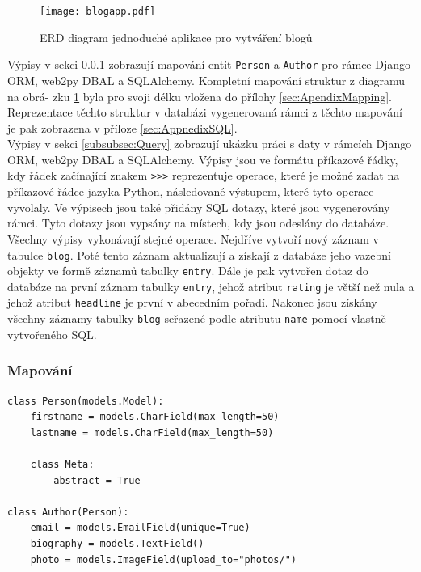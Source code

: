 \documentclass[ing,male,java,dept456]{diploma}						%
\begin{document}
\begin{figure}[h!]
    \centering
    \texttt{[image: blogapp.pdf]}
    \caption{ERD diagram jednoduché aplikace pro vytváření blogů}
    \label{fig:BlogappErd}
\end{figure}

Výpisy v sekci \ref{subsubsec:Mapping} zobrazují mapování entit \lstinline[style=inlinepython]|Person| a \lstinline[style=inlinepython]|Author| pro rámce Django ORM, web2py DBAL a SQLAlchemy. Kompletní mapování struktur z diagramu na obrá- zku \ref{fig:BlogappErd} byla pro svoji délku vložena do přílohy \ref{sec:ApendixMapping}. Reprezentace těchto struktur v databázi vygenerovaná rámci z těchto mapování je pak zobrazena v příloze \ref{sec:AppnedixSQL}. \\
Výpisy v sekci \ref{subsubsec:Query} zobrazují ukázku práci s daty v rámcích Django ORM, web2py DBAL a SQLAlchemy. Výpisy jsou ve formátu příkazové řádky, kdy řádek začínající znakem \lstinline[style=inlinepython]|>>>| reprezentuje operace, které je možné zadat na příkazové řádce jazyka Python, následované výstupem, které tyto operace vyvolaly. Ve výpisech jsou také přidány SQL dotazy, které jsou vygenerovány rámci. Tyto dotazy jsou vypsány na místech, kdy jsou odeslány do databáze. \\
Všechny výpisy vykonávají stejné operace. Nejdříve vytvoří nový záznam v tabulce \lstinline[style=inlinepython]|blog|. Poté tento záznam aktualizují a získají z databáze jeho vazební objekty ve formě záznamů tabulky \lstinline[style=inlinepython]|entry|. Dále je pak vytvořen dotaz do databáze na první záznam tabulky \lstinline[style=inlinepython]|entry|, jehož atribut \lstinline[style=inlinepython]|rating| je větší než nula a jehož atribut \lstinline[style=inlinepython]|headline| je první v abecedním pořadí. Nakonec jsou získány všechny záznamy tabulky \lstinline[style=inlinepython]|blog| seřazené podle atributu \lstinline[style=inlinepython]|name| pomocí vlastně vytvořeného SQL.

\subsubsection{Mapování}
\label{subsubsec:Mapping}
\begin{lstlisting}[style=custompython, emphstyle={\bfseries}, label=src:Light-Mapping, caption=Ukázka mapování v Django ORM]
class Person(models.Model):
    firstname = models.CharField(max_length=50)
    lastname = models.CharField(max_length=50)

    class Meta:
        abstract = True
        
class Author(Person):
    email = models.EmailField(unique=True)
    biography = models.TextField()
    photo = models.ImageField(upload_to="photos/")
\end{lstlisting}
\end{document}
